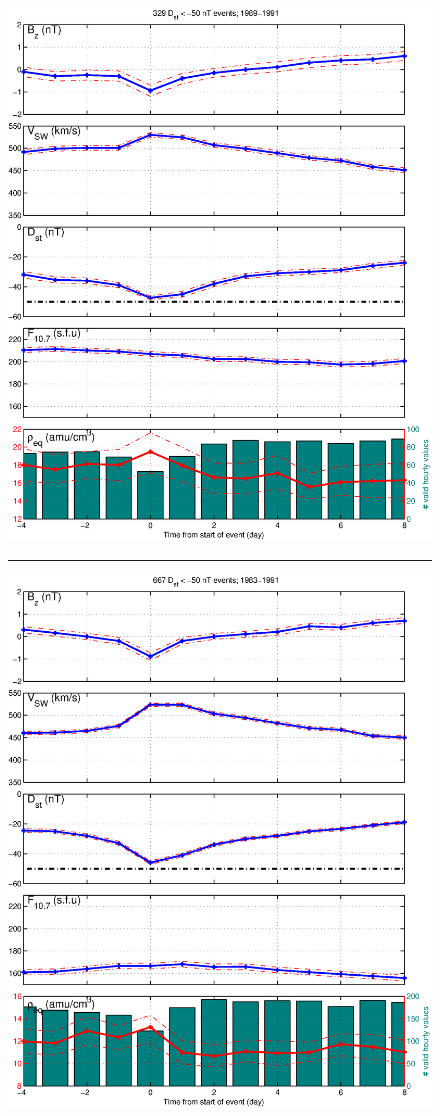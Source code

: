 \documentclass[10pt,twocolumn]{article}
\begin{document}
\begin{figure}[tp!]
\centering
\includegraphics[scale=0.40]{figures/stormavs-dst-50-tak-GOES6.eps}
\rule[1ex]{5cm}{1pt}
\includegraphics[scale=0.40]{figures/stormavs-dst-day-GOES6.eps}

\end{figure}
\end{document}
